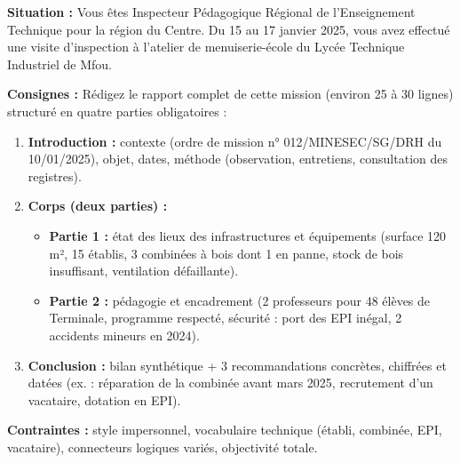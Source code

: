 \documentclass[11pt]{article}
\begin{document}
\begin{exercice}
\textbf{Situation :} Vous êtes Inspecteur Pédagogique Régional de l'Enseignement Technique pour la région du Centre. Du 15 au 17 janvier 2025, vous avez effectué une visite d'inspection à l'atelier de menuiserie-école du Lycée Technique Industriel de Mfou.

\textbf{Consignes :}
Rédigez le rapport complet de cette mission (environ 25 à 30 lignes) structuré en quatre parties obligatoires :
\begin{enumerate}
    \item \textbf{Introduction :} contexte (ordre de mission n° 012/MINESEC/SG/DRH du 10/01/2025), objet, dates, méthode (observation, entretiens, consultation des registres).
    \item \textbf{Corps (deux parties) :}
        \begin{itemize}
            \item \textbf{Partie 1 :} état des lieux des infrastructures et équipements (surface 120 m², 15 établis, 3 combinées à bois dont 1 en panne, stock de bois insuffisant, ventilation défaillante).
            \item \textbf{Partie 2 :} pédagogie et encadrement (2 professeurs pour 48 élèves de Terminale, programme respecté, sécurité : port des EPI inégal, 2 accidents mineurs en 2024).
        \end{itemize}
    \item \textbf{Conclusion :} bilan synthétique + 3 recommandations concrètes, chiffrées et datées (ex. : réparation de la combinée avant mars 2025, recrutement d'un vacataire, dotation en EPI).
\end{enumerate}
\textbf{Contraintes :} style impersonnel, vocabulaire technique (établi, combinée, EPI, vacataire), connecteurs logiques variés, objectivité totale.
\end{exercice}
\end{document}
